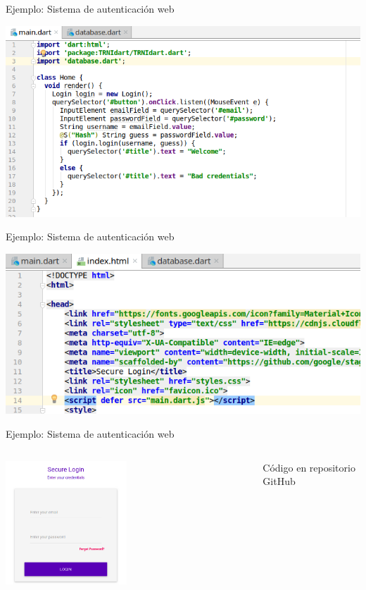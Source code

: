 \documentclass[aspectratio=169,10pt]{beamer}
\begin{document}
\begin{frame}[fragile]{Ejemplo: Sistema de autenticación web}
	\begin{center}
		\includegraphics[width=1.0\textwidth]{images/html4.png}
	\end{center}
\end{frame}

\begin{frame}[fragile]{Ejemplo: Sistema de autenticación web}
	\begin{center}
		\includegraphics[width=1.0\textwidth]{images/html0.png}
	\end{center}
\end{frame}

\begin{frame}[fragile]{Ejemplo: Sistema de autenticación web}
	\begin{columns}[T,onlytextwidth]
		\begin{center}
			\includegraphics[width=0.5\textwidth]{images/screen4.png}
		\end{center}
		\vspace{2cm}
		Código en repositorio GitHub~\cite{repotest}
	\end{columns}

\end{frame}
\end{document}
